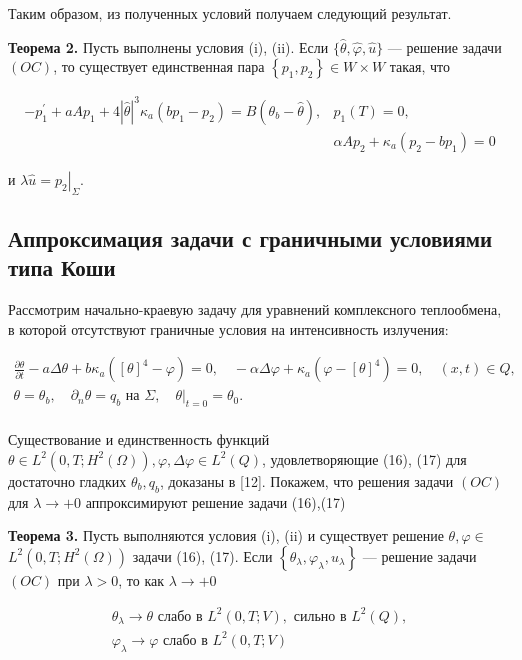 Таким образом, из полученных условий получаем следующий результат.

\textbf{Теорема 2.} Пусть выполнены условия (i), (ii).
Если $\{\widehat{\theta}, \widehat{\varphi}, \widehat{u}\}$ — решение задачи $(OC)$,
то существует единственная пара $\left\{p_ {1}, p_{2}\right\} \in W \times W$ такая, что

\[
\begin{aligned}
-p_{1}^{\prime}+a A p_{1}+4|\widehat{\theta}|^{3} \kappa_{a}\left(b p_{1}-p_{2}\right)=
B\left(\theta_{b}-\widehat{\theta}\right), & p_{1}(T)=0, \\
& \alpha A p_{2}+\kappa_{a}\left(p_{2}-b p_{1}\right)=0
\end{aligned}
\]


и $\lambda \widehat{u}=\left.p_{2}\right|_{\Sigma}$.

\subsection{Аппроксимация задачи с граничными условиями типа Коши}\label{subsec:ch2/sec3/subsec5}
Рассмотрим начально-краевую задачу для уравнений комплексного теплообмена, в которой отсутствуют
граничные условия на интенсивность излучения:

\begin{gather*}
    \frac{\partial \theta}{\partial t}-a \Delta \theta+b \kappa_{a}\left([\theta]^{4}
-\varphi\right)=0,
\quad-\alpha \Delta \varphi+\kappa_{a}\left(\varphi-[\theta]^{4}\right)=0, \quad(x, t) \in Q,\\
    \theta=\theta_{b}, \quad \partial_{n} \theta=q_{b} \text { на } \Sigma,\left.\quad \theta\right|_{t=0}=\theta_{0}.\\
\end{gather*}


Существование и единственность функций $\theta \in L^{2}\left(0, T; H^{2}(\Omega)\right),
\varphi, \Delta \varphi \in L^{2}( Q)$, удовлетворяющие (16), (17) для достаточно гладких
$\theta_{b}, q_{b}$, доказаны в [12].
Покажем, что решения задачи $(OC)$ для $\lambda \rightarrow+0$ аппроксимируют решение задачи (16),(17)

\textbf{Теорема 3.}
Пусть выполняются условия (i), (ii) и существует решение
$\theta, \varphi \in$ $L^{2}\left(0, T ; H^{2}(\Omega) \right)$ задачи (16), (17).
Если $\left\{\theta_{\lambda}, \varphi_{\lambda}, u_{\lambda}\right\}$ — решение задачи $(OC)$
при $\lambda>0$, то как $\lambda\rightarrow+0$

\[
\begin{gathered}
\theta_{\lambda} \rightarrow \theta \text { слабо в } L^{2}(0, T ; V), \text { сильно в } L^{2}(Q), \\
\varphi_{\lambda} \rightarrow \varphi \text { слабо в } L^{2}(0, T ; V)
\end{gathered}
\]


